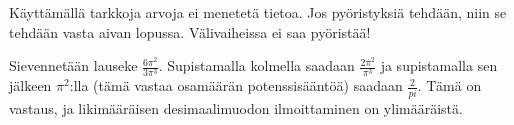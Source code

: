 Käyttämällä tarkkoja arvoja ei menetetä tietoa. Jos pyöristyksiä tehdään, niin se tehdään vasta aivan lopussa. Välivaiheissa ei saa pyöristää!

\begin{esimerkki}
Sievennetään lauseke $\frac{6\pi^2}{3\pi^3}$. Supistamalla kolmella saadaan $\frac{2\pi^2}{\pi^3}$ ja supistamalla sen jälkeen $\pi^2$:lla (tämä vastaa osamäärän potenssisääntöä) saadaan $\frac{2}{pi}$. Tämä on vastaus, ja likimääräisen desimaalimuodon ilmoittaminen on ylimääräistä.
\end{esimerkki}


